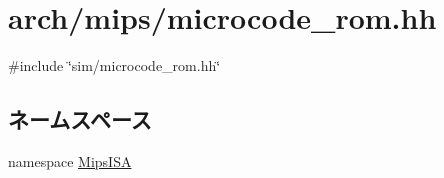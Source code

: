 \hypertarget{arch_2mips_2microcode__rom_8hh}{
\section{arch/mips/microcode\_\-rom.hh}
\label{arch_2mips_2microcode__rom_8hh}
}
{\ttfamily \#include \char`\"{}sim/microcode\_\-rom.hh\char`\"{}}\par
\subsection*{ネームスペース}
\begin{DoxyCompactItemize}
\item 
namespace \hyperlink{namespaceMipsISA}{MipsISA}
\end{DoxyCompactItemize}
